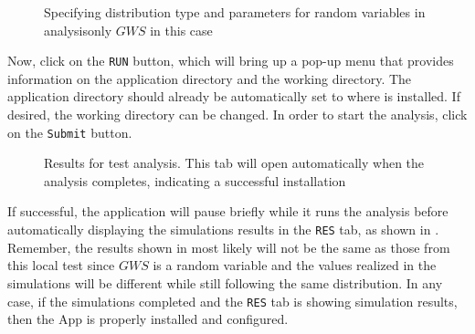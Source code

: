 \begin{figure}[!htbp]
  \caption{Specifying distribution type and parameters for random
  variables in analysis\textemdash only $GWS$ in this case}
  \label{fig:input_uq}
\end{figure}

Now, click on the \texttt{RUN} button, which will bring up a pop-up
menu that provides information on the application directory and
the working directory. The application directory should already be
automatically set to where \texttt{\getsoftwarename{}} is installed.
If desired, the working directory can be changed. In order to start
the analysis, click on the \texttt{Submit} button.

\begin{figure}[!htbp]
  \caption{Results for test analysis. This tab will open automatically
  when the analysis completes, indicating a successful installation}
  \label{fig:show_results}
\end{figure}



If successful, the application will pause briefly while it runs the
analysis before automatically displaying the simulations results in
the \texttt{RES} tab, as shown
in . Remember, the results shown
in  most likely will not be the same as
those from this local test since $GWS$ is a random variable and
the values realized in the simulations will be different while still
following the same distribution. In any case, if the simulations
completed and the \texttt{RES} tab is showing simulation results, then
the \texttt{\getsoftwarename{}} App is properly installed and configured.
